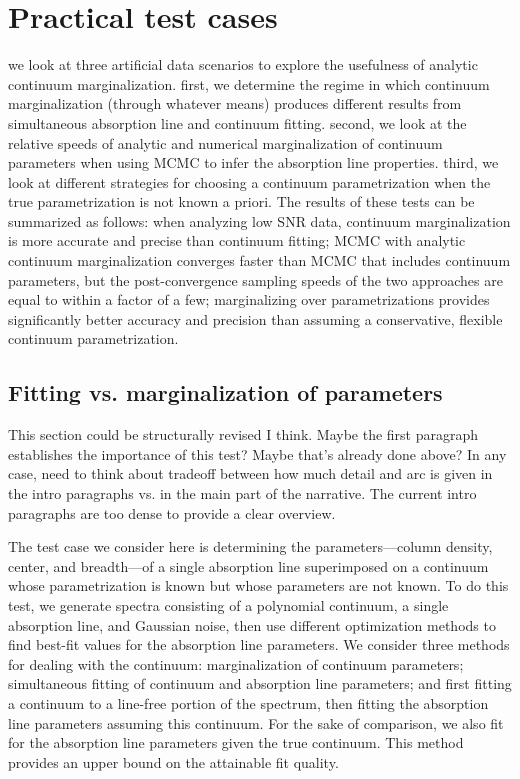 \documentclass[manuscript]{aastex62}
\begin{document}
\section{Practical test cases}
we look at three artificial data scenarios to explore the usefulness of analytic continuum marginalization.
first, we determine the regime in which continuum marginalization (through whatever means) produces different results from simultaneous absorption line and continuum fitting.
second, we look at the relative speeds of analytic and numerical marginalization of continuum parameters when using MCMC to infer the absorption line properties.
third, we look at different strategies for choosing a continuum parametrization when the true parametrization is not known a priori.
The results of these tests can be summarized as follows: when analyzing low SNR data, continuum marginalization is more accurate and precise than continuum fitting; MCMC with analytic continuum marginalization converges faster than MCMC that includes continuum parameters, but the post-convergence sampling speeds of the two approaches are equal to within a factor of a few; marginalizing over parametrizations provides significantly better accuracy and precision than assuming a conservative, flexible continuum parametrization.

\subsection{Fitting vs. marginalization of parameters}
This section could be structurally revised I think. Maybe the first paragraph establishes the importance of this test? Maybe that's already done above? In any case, need to think about tradeoff between how much detail and arc is given in the intro paragraphs vs. in the main part of the narrative. The current intro paragraphs are too dense to provide a clear overview.

The test case we consider here is determining the parameters---column density, center, and breadth---of a single absorption line superimposed on a continuum whose parametrization is known but whose parameters are not known.
To do this test, we generate spectra consisting of a polynomial continuum, a single absorption line, and Gaussian noise, then use different optimization methods to find best-fit values for the absorption line parameters.
We consider three methods for dealing with the continuum: marginalization of continuum parameters; simultaneous fitting of continuum and absorption line parameters; and first fitting a continuum to a line-free portion of the spectrum, then fitting the absorption line parameters assuming this continuum.
For the sake of comparison, we also fit for the absorption line parameters given the true continuum.
This method provides an upper bound on the attainable fit quality.
\end{document}
